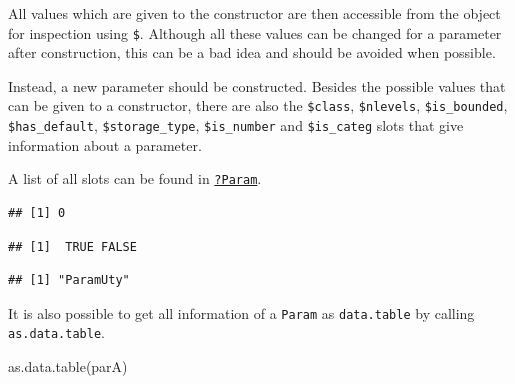 \documentclass[
]{scrbook}
\newenvironment{Shaded}{\begin{snugshade}}{\end{snugshade}}
\newcommand{\FunctionTok}[1]{\textcolor[rgb]{0.00,0.00,0.00}{#1}}
\newcommand{\NormalTok}[1]{#1}
\newcommand{\SpecialCharTok}[1]{\textcolor[rgb]{0.00,0.00,0.00}{#1}}
\renewenvironment{Shaded} {\begin{snugshade}\small} {\end{snugshade}}
\begin{document}
All values which are given to the constructor are then accessible from the object for inspection using \texttt{\$}.
Although all these values can be changed for a parameter after construction, this can be a bad idea and should be avoided when possible.

Instead, a new parameter should be constructed.
Besides the possible values that can be given to a constructor, there are also the \texttt{\$class}, \texttt{\$nlevels}, \texttt{\$is\_bounded}, \texttt{\$has\_default}, \texttt{\$storage\_type}, \texttt{\$is\_number} and \texttt{\$is\_categ} slots that give information about a parameter.

A list of all slots can be found in \href{https://paradox.mlr-org.com/reference/Param.html}{\texttt{?Param}}.

\begin{Shaded}
\end{Shaded}

\begin{verbatim}
## [1] 0
\end{verbatim}

\begin{Shaded}
\end{Shaded}

\begin{verbatim}
## [1]  TRUE FALSE
\end{verbatim}

\begin{Shaded}
\end{Shaded}

\begin{verbatim}
## [1] "ParamUty"
\end{verbatim}

It is also possible to get all information of a \texttt{Param} as \texttt{data.table} by calling \texttt{as.data.table}.

\begin{Shaded}
\begin{Highlighting}[]
\FunctionTok{as.data.table}\NormalTok{(parA)}
\end{Highlighting}
\end{Shaded}
\end{document}
